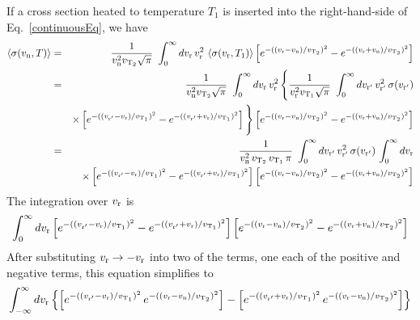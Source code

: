 \documentclass[11pt,twoside]{article}
\begin{document}
If a cross section heated to temperature $T_1$ is inserted into the right-hand-side of Eq.~\ref{continuousEq}, we have
\begin{eqnarray}	\label{continuousEq2}
    \left<\sigma(v_{\rm n},T)\right> 
        & = & { 1 \over v_{\rm n}^2 v_{{\rm T}_2} \sqrt{\pi} } \ \int_0^\infty dv_{\rm r} \,
            v_{\rm r}^2 \, \left<\sigma(v_{\rm r},T_1)\right> \left[ e^{-( ( v_{\rm r} - v_{\rm n} ) / v_{{\rm T}_2} )^2 } 
            - e^{-( ( { v_{\rm r} + v_{\rm n} ) / v_{{\rm T}_2} } )^2 } \right] \nonumber \\
        & = & { 1 \over v_{\rm n}^2 v_{{\rm T}_2} \sqrt{\pi} } \ \int_0^\infty dv_{\rm r} \, v_{\rm r}^2 \, 
            \Bigg\{ { 1 \over v_{\rm r}^2 v_{{\rm T}_1} \sqrt{\pi} } \ \int_0^\infty dv_{\rm r'} \, v_{\rm r'}^2 \, \sigma(v_{\rm r'}) \nonumber \\
        & & \times \left[ e^{-( ( v_{\rm r'} - v_{\rm r} ) / v_{{\rm T}_1})^2 } - e^{-(( v_{\rm r'} + v_{\rm r} ) / v_{{\rm T}_1} )^2 } \right] \Bigg\} 
            \left[ e^{-( ( v_{\rm r} - v_{\rm n} ) / v_{{\rm T}_2} )^2 }
            - e^{-( ( v_{\rm r} + v_{\rm n} ) / v_{{\rm T}_2 } )^2 } \right] \nonumber \\
        & = & { 1 \over v_{\rm n}^2 \, v_{{\rm T}_2} \, v_{{\rm T}_1} \, \pi } \ \int_0^\infty dv_{\rm r'} \, v_{\rm r'}^2 \, \sigma(v_{\rm r'}) \, 
            \int_0^\infty dv_{\rm r} \nonumber \\
        & & \times \left[ e^{-( ( v_{\rm r'} - v_{\rm r} ) / v_{{\rm T}_1} )^2 } - e^{-( ( v_{\rm r'} + v_{\rm r} ) / v_{{\rm T}_1} )^2 } \right]
            \left[ e^{-( ( v_{\rm r} - v_{\rm n} ) / v_{{\rm T}_2} )^2} - e^{-( ( v_{\rm r} + v_{\rm n} ) / v_{{\rm T}_2 } )^2 } \right]
\end{eqnarray}
The integration over $v_{\rm r}$ is
\begin{equation}
    \int_0^\infty dv_{\rm r} \left[ e^{-( ( v_{\rm r'} - v_{\rm r} ) / v_{{\rm T}_1} )^2 } - e^{-( ( v_{\rm r'} + v_{\rm r} ) / v_{{\rm T}_1} )^2 } \right]
        \left[ e^{-( ( v_{\rm r} - v_{\rm n} ) / v_{{\rm T}_2} )^2} - e^{-( ( v_{\rm r} + v_{\rm n} ) / v_{{\rm T}_2 } )^2 } \right]
\end{equation}
After substituting $v_{\rm r} \rightarrow -v_{\rm r}$ into two of the terms, one each of the positive and negative terms, this equation simplifies to
\begin{equation} \label{vrIntegral}
    \int_{-\infty}^\infty dv_{\rm r} \left\{
    \left[ e^{-( ( v_{\rm r'} - v_{\rm r} ) / v_{{\rm T}_1} )^2 } \, e^{-( ( v_{\rm r} - v_{\rm n} ) / v_{{\rm T}_2} )^2 } \right] -
    \left[ e^{-( ( v_{\rm r'} + v_{\rm r} ) / v_{{\rm T}_1} )^2 } \, e^{-( ( v_{\rm r} - v_{\rm n} ) / v_{{\rm T}_2} )^2 } \right] \right\}
\end{equation}
\end{document}
